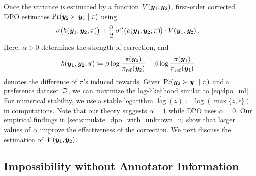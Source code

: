 Once the variance is estimated by a function~$V({\bm{y}}_1, {\bm{y}}_2)$, first-order corrected DPO estimates $\Pr({\bm{y}}_2 \succ {\bm{y}}_1 \mid \pi)$ using
%
\begin{equation*}
    \sigma\big(h({\bm{y}}_1, {\bm{y}}_2; \pi)\big)
    + \frac{\alpha}{2} \, \sigma''\big(h({\bm{y}}_1, {\bm{y}}_2; \pi)\big) \cdot V({\bm{y}}_1, {\bm{y}}_2) 
    \,.
\end{equation*}
%
Here, $\alpha > 0$ determines the strength of correction, and 
%
\begin{equation}
\label{eq:def_h}
    h({\bm{y}}_1, {\bm{y}}_2; \pi) \coloneqq \beta \log\frac{\pi({\bm{y}}_2)}{\pi_{\rm ref}({\bm{y}}_2)} - \beta \log\frac{\pi({\bm{y}}_1)}{\pi_{\rm ref}({\bm{y}}_1)}
\end{equation}
%
denotes the difference of $\pi$'s induced rewards.
Given $\Pr({\bm{y}}_2 \succ {\bm{y}}_1 \mid \pi)$ and a preference dataset~${\mathcal{D}}$, we can maximize the log-likelihood similar to \cref{eq:dpo_ml}. For numerical stability, we use a stable logarithm $\widetilde{\log}(z) \coloneqq \log(\max \{z, \epsilon\})$ in computations. Note that our theory suggests $\alpha = 1$ while DPO uses $\alpha = 0$. Our empirical findings in \cref{sec:simulate_dpo_with_unknown_u} show that larger values of~$\alpha$ improve the effectiveness of the correction. We next discuss the estimation of~$V({\bm{y}}_1, {\bm{y}}_2)$.



\subsection{Impossibility without Annotator Information}
\label{sec:impossible_approx}

